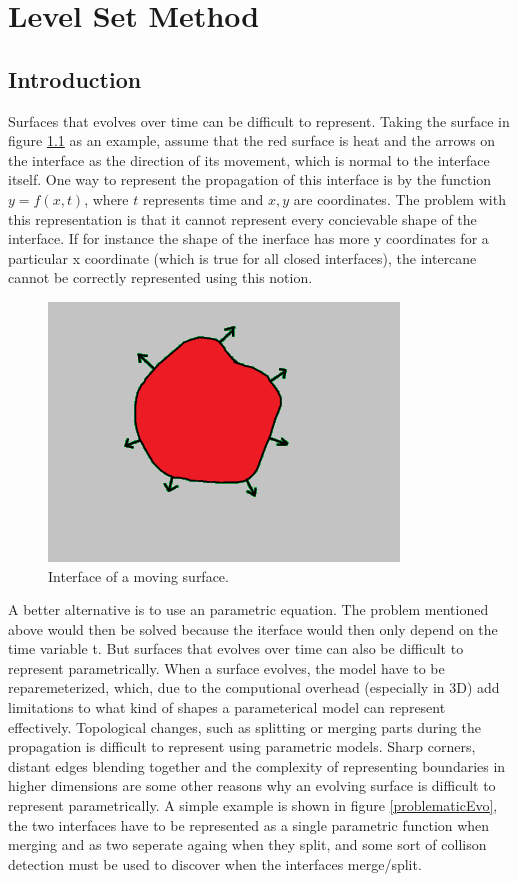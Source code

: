 \chapter{Level Set Method}
\section{Introduction}
Surfaces that evolves over time can be difficult to represent. Taking the surface in figure \ref{interface} as an example, assume that the red surface is heat and the arrows on the interface as the direction of its movement, which is normal to the interface itself. One way to represent the propagation of this interface is by the function $y = f(x,t)$, where $t$ represents time and $x,y$ are coordinates. The problem with this representation is that it cannot represent every concievable shape of the interface. If for instance the shape
of the inerface has more y coordinates for a particular x coordinate (which is true for all closed interfaces), the intercane cannot be correctly represented using this notion.
\begin{figure}[h!]
\centering
\includegraphics[width=.5\textwidth]{levelset/interface}
\caption{Interface of a moving surface.}
\label{interface}
\end{figure}
A better alternative is to use an parametric equation. The problem mentioned above would then be solved because the iterface would then only depend on the time variable t. But surfaces that evolves over time can also be difficult to represent parametrically. When a surface evolves, the model have to be reparemeterized, which, due to the computional overhead (especially in 3D) add limitations to what kind of shapes a parameterical model can represent effectively. Topological changes, such as splitting or merging parts during the propagation is difficult to represent using parametric models. Sharp corners, distant edges blending together and the complexity of representing boundaries in higher dimensions are some other reasons why an evolving surface is difficult to represent parametrically. A simple example is shown in figure \ref{problematicEvo}, the two interfaces have to be represented as a single parametric function when merging and as two seperate againg when they split, and some sort of collison detection must be used to discover when the interfaces merge/split.
